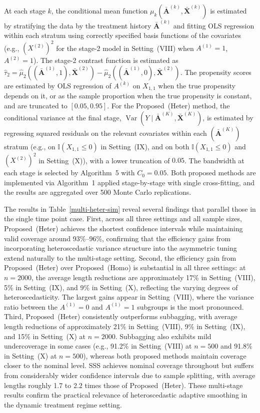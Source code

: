 \documentclass[11pt]{article}
\theoremstyle{referenceplain}
\theoremstyle{referencedefinition}
\theoremstyle{referenceremark}
\begin{document}
At each stage $k$, the conditional mean function $\mu_k(\bar{\mathbf{A}}^{(k)}, \bar{\mathbf{X}}^{(k)})$ is estimated by stratifying the data by the treatment history $\bar{\mathbf{A}}^{(k)}$ and fitting OLS regression within each stratum using correctly specified basis functions of the covariates (e.g., $(X^{(2)})^2$ for the stage-2 model in Setting~(VIII) when $A^{(1)}=1$, $A^{(2)}=1$). The stage-2 contrast function is estimated as $\widehat{\tau}_2 = \widehat{\mu}_2((\bar{\mathbf{A}}^{(1)},1),\bar{\mathbf{X}}^{(2)}) - \widehat{\mu}_2((\bar{\mathbf{A}}^{(1)},0),\bar{\mathbf{X}}^{(2)})$. The propensity scores are estimated by OLS regression of $A^{(k)}$ on $X_{1,1}$ when the true propensity depends on it, or as the sample proportion when the true propensity is constant, and are truncated to $[0.05,0.95]$. For the Proposed~(Heter) method, the conditional variance at the final stage, $\operatorname{Var}(Y\mid \bar{\mathbf{A}}^{(K)}, \bar{\mathbf{X}}^{(K)})$, is estimated by regressing squared residuals on the relevant covariates within each $(\bar{\mathbf{A}}^{(K)})$ stratum (e.g., on $\mathbb{I}(X_{1,1}\leq 0)$ in Setting~(IX), and on both $\mathbb{I}(X_{1,1}\leq 0)$ and $(X^{(2)})^2$ in Setting~(X)), with a lower truncation of $0.05$. The bandwidth at each stage is selected by Algorithm~5 with ${C_0}=0.05$. Both proposed methods are implemented via Algorithm~1 applied stage-by-stage with single cross-fitting, and the results are aggregated over 500 Monte Carlo replications.

The results in Table~\ref{multi-heter-sim} reveal several findings that parallel those in the single time point case. First, across all three settings and all sample sizes, Proposed~(Heter) achieves the shortest confidence intervals while maintaining valid coverage around 93\%--96\%, confirming that the efficiency gains from incorporating heteroscedastic variance structure into the asymmetric tuning extend naturally to the multi-stage setting. Second, the efficiency gain from Proposed~(Heter) over Proposed~(Homo) is substantial in all three settings: at $n = 2000$, the average length reductions are approximately 17\% in Setting~(VIII), 5\% in Setting~(IX), and 9\% in Setting~(X), reflecting the varying degrees of heteroscedasticity. The largest gains appear in Setting~(VIII), where the variance ratio between the $A^{(1)} = 0$ and $A^{(1)} = 1$ subgroups is the most pronounced. Third, Proposed~(Heter) consistently outperforms subbagging, with average length reductions of approximately 21\% in Setting~(VIII), 9\% in Setting~(IX), and 15\% in Setting~(X) at $n = 2000$. Subbagging also exhibits mild undercoverage in some cases (e.g., 91.2\% in Setting~(VIII) at $n = 500$ and 91.8\% in Setting~(X) at $n = 500$), whereas both proposed methods maintain coverage closer to the nominal level. SSS achieves nominal coverage throughout but suffers from considerably wider confidence intervals due to sample splitting, with average lengths roughly 1.7 to 2.2 times those of Proposed~(Heter). These multi-stage results confirm the practical relevance of heteroscedastic adaptive smoothing in the dynamic treatment regime setting.
\end{document}

